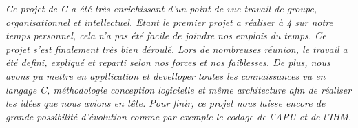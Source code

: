 \emph{  Ce projet de C a été très enrichissant d'un point de vue travail de groupe, organisationnel et intellectuel. Etant le premier projet a réaliser à 4 sur notre temps personnel, cela n'a pas été facile de joindre nos emplois du temps. Ce projet s'est finalement très bien déroulé. Lors de nombreuses réunion, le travail a été defini, expliqué et reparti selon nos forces et nos faiblesses. De plus, nous avons pu mettre en appllication et develloper toutes les connaissances vu en langage C, méthodologie conception logicielle et même architecture afin de réaliser les idées que nous avions en tête. Pour finir, ce projet nous laisse encore de grande possibilité d'évolution comme par exemple le codage de l'APU et de l'IHM.}
